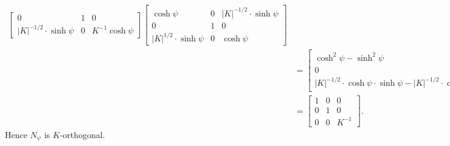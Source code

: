 \documentclass[newpage,hints,handout]{ximera}
\begin{document}
\begin{problem}
\begin{freeResponse}
\begin{align*}
\begin{bmatrix}
    0 & 1 & 0\\
    |K|^{-1/2}\cdot\sinh\psi & 0 &  K^{-1}\cosh\psi
      \end{bmatrix}
 \begin{bmatrix}
    \cosh\psi & 0 & |K|^{-1/2}\cdot\sinh\psi\\
    0 & 1 & 0\\
    |K|^{1/2}\cdot\sinh\psi & 0 & \cosh\psi
 \end{bmatrix}\\
&=\begin{bmatrix}
    \cosh^2\psi -\sinh^2\psi & 0 & |K|^{-1/2}\cdot\cosh\psi\cdot\sinh\psi- |K|^{-1/2}\cdot\cosh\psi\cdot\sinh\psi\\
    0 & 1 & 0\\
    |K|^{-1/2}\cdot\cosh\psi\cdot\sinh\psi- |K|^{-1/2}\cdot\cosh\psi\cdot\sinh\psi & 0 &  K^{-1}(\cosh^2\psi -\sinh^2\psi )
 \end{bmatrix}\\
 &=\begin{bmatrix}
        1 & 0 & 0 \\
        0 & 1 & 0 \\
        0 & 0 & K^{-1}
      \end{bmatrix}.
    \end{align*}
    Hence $N_\psi$ is $K$-orthogonal.
  \end{freeResponse}
\end{problem}
\end{document}
